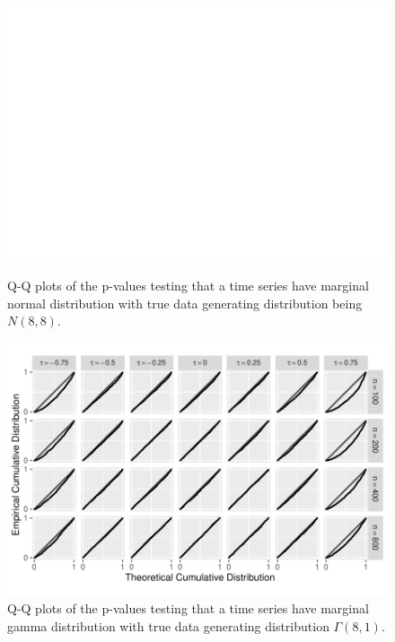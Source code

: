 \documentclass[12pt]{article}
\begin{document}
\begin{figure}[tbp]
  \includegraphics[width = .9\textwidth]{figures/normal}
  \centering
  \caption{Q-Q plots of the p-values testing that a time series
    have marginal normal distribution with true data generating distribution
    being $N(8,8)$.}
    \hspace{5cm}
  \includegraphics[width = .9\textwidth]{figures/gamma}
  \caption{Q-Q plots of the p-values testing that a time series
    have marginal gamma distribution with true data
    generating distribution $\Gamma(8,1)$.}
  \label{fig:qq}
\end{figure}
\end{document}
